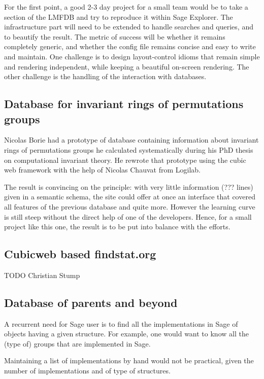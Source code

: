 \documentclass{article}
\begin{document}
For the first point, a good 2-3 day project for a small team would be
to take a section of the LMFDB and try to reproduce it within Sage
Explorer. The infrastructure part will need to be extended to handle
searches and queries, and to beautify the result. The metric of
success will be whether it remains completely generic, and whether the
config file remains concise and easy to write and maintain. One
challenge is to design layout-control idioms that remain simple and
rendering independent, while keeping a beautiful on-screen
rendering. The other challenge is the handling of the interaction with
databases.

\subsection{Database for invariant rings of permutations groups}

Nicolas Borie had a prototype of database containing information about
invariant rings of permutations groups he calculated systematically
during his PhD thesis on computational invariant theory. He rewrote
that prototype using the cubic web framework with the help of Nicolas
Chauvat from Logilab.

The result is convincing on the principle: with very little
information (??? lines) given in a semantic schema, the site could
offer at once an interface that covered all features of the previous
database and quite more.  However the learning curve is still steep
without the direct help of one of the developers. Hence, for a small
project like this one, the result is to be put into balance with the
efforts.

\subsection{Cubicweb based findstat.org}

TODO Christian Stump

\subsection{Database of parents and beyond}

A recurrent need for Sage user is to find all the implementations in
Sage of objects having a given structure. For example, one would want
to know all the (type of) groups that are implemented in Sage.

Maintaining a list of implementations by hand would not be practical,
given the number of implementations and of type of structures.
\end{document}
